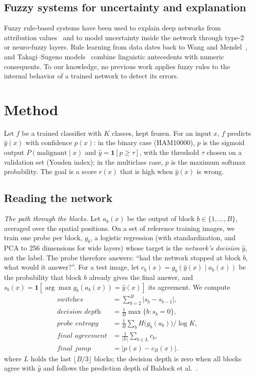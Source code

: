 \documentclass[conference,a4paper]{IEEEtran}
\begin{document}
\subsection{Fuzzy systems for uncertainty and explanation}
Fuzzy rule-based systems have been used to explain deep networks from attribution values~\cite{aghaeipoor2023} and to model uncertainty
inside the network through type-2 or neuro-fuzzy layers. Rule learning from data dates back to Wang and Mendel~\cite{wangmendel1992},
and Takagi--Sugeno models~\cite{takagi1985} combine linguistic antecedents with numeric consequents. To our knowledge, no previous work
applies fuzzy rules to the internal behavior of a trained network to detect its errors.

\section{Method}

Let $f$ be a trained classifier with $K$ classes, kept frozen. For an input $x$, $f$ predicts $\hat y(x)$ with confidence $p(x)$:
in the binary case (HAM10000), $p$ is the sigmoid output $P(\text{malignant}\mid x)$ and $\hat y = \mathbf{1}[p \ge \tau]$, with the
threshold $\tau$ chosen on a validation set (Youden index); in the multiclass case, $p$ is the maximum softmax probability.
The goal is a score $r(x)$ that is high when $\hat y(x)$ is wrong.

\subsection{Reading the network}
\label{sec:reading}

\textit{The path through the blocks.}
Let $a_b(x)$ be the output of block $b \in \{1,\dots,B\}$, averaged over the spatial positions. On a set of reference training images,
we train one probe per block, $g_b$, a logistic regression (with standardization, and PCA to 256 dimensions for wide layers) whose target
is the \emph{network's decision} $\hat y$, not the label. The probe therefore answers: ``had the network stopped at block $b$, what would
it answer?''. For a test image, let $c_b(x) = g_b(\hat y(x) \mid a_b(x))$ be the probability that block $b$ already gives the final answer,
and $s_b(x) = \mathbf{1}[\arg\max g_b(a_b(x)) = \hat y(x)]$ its agreement. We compute
\begin{align}
  \textit{switches} &= \textstyle\sum_{b=2}^{B} |s_b - s_{b-1}|, \\
  \textit{decision depth} &= \tfrac{1}{B}\max\{b : s_b = 0\}, \\
  \textit{probe entropy} &= \tfrac{1}{B}\textstyle\sum_{b} H\big(g_b(a_b)\big)/\log K, \\
  \textit{final agreement} &= \tfrac{1}{|L|}\textstyle\sum_{b \in L} c_b, \\
  \textit{final jump} &= |p(x) - c_B(x)|.
\end{align}
where $L$ holds the last $\lfloor B/3 \rfloor$ blocks; the decision depth is zero when all blocks agree with $\hat y$ and follows the prediction depth of Baldock et al.~\cite{baldock2021}.
\end{document}
